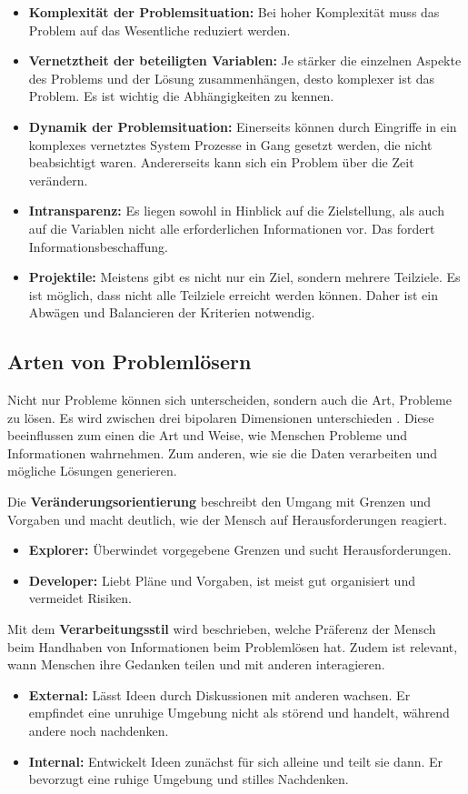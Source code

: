 \begin{itemize}
\item \textbf{Komplexität der Problemsituation:} Bei hoher Komplexität muss das Problem auf das Wesentliche reduziert werden. 
\item \textbf{Vernetztheit der beteiligten Variablen:} Je stärker die einzelnen Aspekte des Problems und der Lösung zusammenhängen, desto komplexer ist das Problem. Es ist wichtig die Abhängigkeiten zu kennen.
\item \textbf{Dynamik der Problemsituation:} Einerseits können durch Eingriffe in ein komplexes vernetztes System Prozesse in Gang gesetzt werden, die nicht beabsichtigt waren. Andererseits kann sich ein Problem über die Zeit verändern.
\item \textbf{Intransparenz:} Es liegen sowohl in Hinblick auf die Zielstellung, als auch auf die Variablen nicht alle erforderlichen Informationen vor. Das fordert Informationsbeschaffung.
\item \textbf{Projektile:} Meistens gibt es nicht nur ein Ziel, sondern mehrere Teilziele. Es ist möglich, dass nicht alle Teilziele erreicht werden können. Daher ist ein Abwägen und Balancieren der Kriterien notwendig.
\end{itemize}

\subsection{Arten von Problemlösern}
Nicht nur Probleme können sich unterscheiden, sondern auch die Art, Probleme zu lösen. Es wird zwischen drei bipolaren Dimensionen unterschieden \cite{Betsch2011}. Diese beeinflussen zum einen die Art und Weise, wie Menschen Probleme und Informationen wahrnehmen. Zum anderen, wie sie die Daten verarbeiten und mögliche Lösungen generieren.

Die \textbf{Veränderungsorientierung} beschreibt den Umgang mit Grenzen und Vorgaben und macht deutlich, wie der Mensch auf Herausforderungen reagiert.
	\begin{itemize}
	\item \textbf{Explorer:} Überwindet vorgegebene Grenzen und sucht Herausforderungen.
	\item \textbf{Developer:} Liebt Pläne und Vorgaben, ist meist gut organisiert und vermeidet Risiken.
	\end{itemize}

Mit dem \textbf{Verarbeitungsstil} wird beschrieben, welche Präferenz der Mensch beim Handhaben von Informationen beim Problemlösen hat. Zudem ist relevant, wann Menschen ihre Gedanken teilen und mit anderen interagieren.
	\begin{itemize}
	\item \textbf{External:} Lässt Ideen durch Diskussionen mit anderen wachsen. Er empfindet eine unruhige Umgebung nicht als störend und handelt, während andere noch nachdenken.
	\item \textbf{Internal:} Entwickelt Ideen zunächst für sich alleine und teilt sie dann. Er bevorzugt eine ruhige Umgebung und stilles Nachdenken.
	\end{itemize}
	
